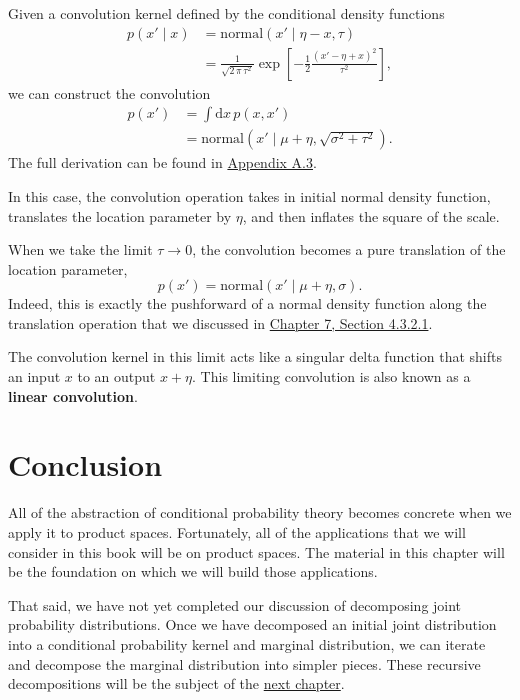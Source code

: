 \documentclass[
  letterpaper,
  DIV=11,
  numbers=noendperiod]{scrartcl}
\begin{document}
Given a convolution kernel defined by the conditional density functions
\begin{align*}
p( x' \mid x )
&=
\text{normal} ( x' \mid \eta - x, \tau )
\\
&=
\frac{1}{ \sqrt{ 2 \, \pi \, \tau^{2} } }
\exp \left[
  -\frac{1}{2} \frac{ ( x' - \eta + x )^{2} }{ \tau^{2} }
\right],
\end{align*} we can construct the convolution \begin{align*}
p( x' )
&=
\int \mathrm{d} x \, p( x, x' )
\\
&=
\text{normal} \left( x' \mid \mu + \eta,
                     \sqrt{ \sigma^{2} + \tau^{2} } \right).
\end{align*} The full derivation can be found in
\hyperref[sec:app3]{Appendix A.3}.

In this case, the convolution operation takes in initial normal density
function, translates the location parameter by \(\eta\), and then
inflates the square of the scale.

When we take the limit \(\tau \rightarrow 0\), the convolution becomes a
pure translation of the location parameter, \[
p( x' )
=
\text{normal} \left( x' \mid \mu + \eta, \sigma \right).
\] Indeed, this is exactly the pushforward of a normal density function
along the translation operation that we discussed in
\href{http://www.symplectomorphic.com/assets/chapters_html/transforming_probability_spaces.html\#examples}{Chapter
7, Section 4.3.2.1}.

The convolution kernel in this limit acts like a singular delta function
that shifts an input \(x\) to an output \(x + \eta\). This limiting
convolution is also known as a \textbf{linear convolution}.

\section{Conclusion}\label{conclusion}

All of the abstraction of conditional probability theory becomes
concrete when we apply it to product spaces. Fortunately, all of the
applications that we will consider in this book will be on product
spaces. The material in this chapter will be the foundation on which we
will build those applications.

That said, we have not yet completed our discussion of decomposing joint
probability distributions. Once we have decomposed an initial joint
distribution into a conditional probability kernel and marginal
distribution, we can iterate and decompose the marginal distribution
into simpler pieces. These recursive decompositions will be the subject
of the
\href{http://www.symplectomorphic.com/assets/chapters_html/conditional_decompositions.html}{next
chapter}.
\end{document}
